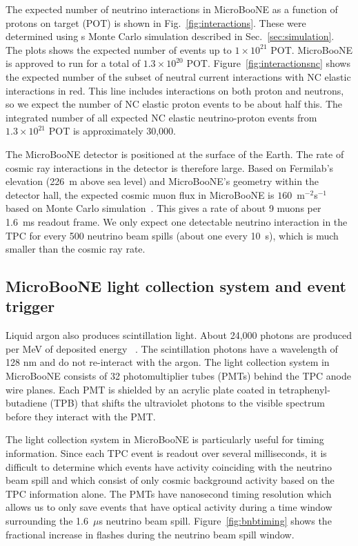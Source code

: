   The expected number of neutrino interactions in MicroBooNE as a function of
  protons on target (POT) is shown in Fig.~\ref{fig:interactions}. These were
  determined using s Monte Carlo simulation described in
  Sec.~\ref{sec:simulation}. The plots shows the expected number of events up
  to $1\times 10^{21}$ POT. MicroBooNE is approved to run for a total of
  $1.3\times 10^{20}$ POT. Figure~\ref{fig:interactionsnc} shows the expected
  number of the subset of neutral current interactions with NC elastic
  interactions in red. This line includes interactions on both proton and
  neutrons, so we expect the number of NC elastic proton events to be about
  half this. The integrated number of all expected NC elastic neutrino-proton
  events from $1.3\times 10^{21}$ POT is approximately 30,000.

  The MicroBooNE detector is positioned at the surface of the Earth. The rate
  of cosmic ray interactions in the detector is therefore large. Based on
  Fermilab's elevation (226~m above sea level) and MicroBooNE's geometry within
  the detector hall, the expected cosmic muon flux in MicroBooNE is
  $160$~m$^{-2}$s$^{-1}$ based on Monte Carlo simulation~\cite{cosmicnote}.
  This gives a rate of about 9 muons per 1.6~ms readout frame. We only expect
  one detectable neutrino interaction in the TPC for every 500 neutrino beam
  spills (about one every 10~s), which is much smaller than the cosmic ray
  rate.

\subsection{MicroBooNE light collection system and event trigger}\label{sec:swtrigger}
  Liquid argon also produces scintillation light. About 24,000 photons are
  produced per MeV of deposited energy ~\cite{detectorpaper}. The scintillation
  photons have a wavelength of 128 nm and do not re-interact with the argon.
  The light collection system in MicroBooNE consists of 32 photomultiplier
  tubes (PMTs) behind the TPC anode wire planes. Each PMT is shielded by an
  acrylic plate coated in tetraphenyl-butadiene (TPB) that shifts the
  ultraviolet photons to the visible spectrum before they interact with the
  PMT.

  The light collection system in MicroBooNE is particularly useful for timing
  information. Since each TPC event is readout over several milliseconds, it is
  difficult to determine which events have activity coinciding with the
  neutrino beam spill and which consist of only cosmic background activity
  based on the TPC information alone. The PMTs have nanosecond timing
  resolution which allows us to only save events that have optical activity
  during a time window surrounding the 1.6~$\mu$s neutrino beam spill.
  Figure~\ref{fig:bnbtiming} shows the fractional increase in flashes during
  the neutrino beam spill window.

